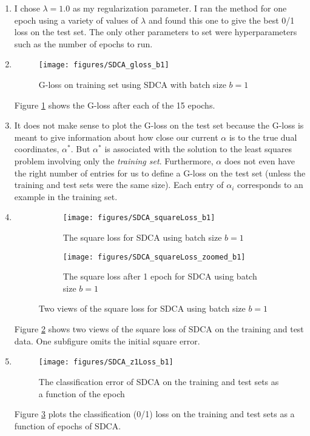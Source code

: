 \documentclass{article}
\begin{document}
\begin{enumerate}
	\item I chose $\lambda=1.0$ as my regularization parameter. I ran the method for one epoch using a variety of values of $\lambda$ and found this one to give the best 0/1 loss on the test set. The only other parameters to set were hyperparameters such as the number of epochs to run.

	\item
	\begin{figure}
		\centering
		\texttt{[image: figures/SDCA\_gloss\_b1]}
		\caption{G-loss on training set using SDCA with batch size $b=1$} 
		\label{fig:SDCA_gloss_b1}
	\end{figure}
	Figure \ref{fig:SDCA_gloss_b1} shows the G-loss after each of the 15 epochs.

	\item It does not make sense to plot the G-loss on the test set because the G-loss is meant to give information about how close our current $\alpha$ is to the true dual coordinates, $\alpha^*$. But $\alpha^*$ is associated with the solution to the least squares problem involving only the \emph{training set}. Furthermore, $\alpha$ does not even have the right number of entries for us to define a G-loss on the test set (unless the training and test sets were the same size). Each entry of $\alpha_i$ corresponds to an example in the training set.

	\item
	\begin{figure}
		\centering
		\begin{subfigure}{0.49\textwidth}
			\centering
			\texttt{[image: figures/SDCA\_squareLoss\_b1]}
			\caption{The square loss for SDCA using batch size $b=1$}
		\end{subfigure}
		\begin{subfigure}{0.49\textwidth}
			\centering
			\texttt{[image: figures/SDCA\_squareLoss\_zoomed\_b1]}
			\caption{The square loss after 1 epoch for SDCA using batch size $b=1$}
		\end{subfigure}
		\caption{Two views of the square loss for SDCA using batch size $b=1$} 
		\label{fig:SDCA_squareLoss_b1}
	\end{figure}
	Figure \ref{fig:SDCA_squareLoss_b1} shows two views of the square loss of SDCA on the training and test data. One subfigure omits the initial square error.

	\item
	\begin{figure}
		\centering
		\texttt{[image: figures/SDCA\_z1Loss\_b1]}
		\caption{The classification error of SDCA on the training and test sets as a function of the epoch} 
		\label{fig:SDCA_z1Loss_b1}
	\end{figure}
	Figure \ref{fig:SDCA_z1Loss_b1} plots the classification (0/1) loss on the training and test sets as a function of epochs of SDCA.


\end{enumerate}
\end{document}
